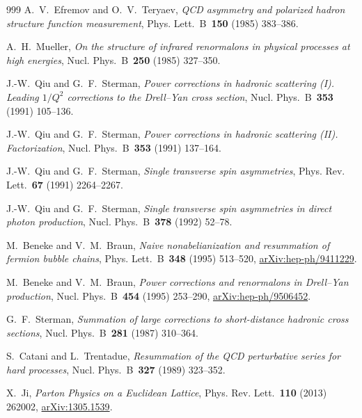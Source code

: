 \begin{thebibliography}{999}
A.~V.~Efremov and O.~V.~Teryaev, \emph{QCD asymmetry and polarized hadron structure function measurement}, Phys. Lett.~B~\textbf{150} (1985) \mbox{383--386}.

A.~H.~Mueller, \emph{On the structure of infrared renormalons in physical processes at high energies}, Nucl. Phys.~B~\textbf{250} (1985) \mbox{327--350}.

J.-W.~Qiu and G.~F.~Sterman, \emph{Power corrections in hadronic scattering (I). Leading $1/Q^2$ corrections to the Drell--Yan cross section}, Nucl. Phys.~B~\textbf{353} (1991) \mbox{105--136}.

J.-W.~Qiu and G.~F.~Sterman, \emph{Power corrections in hadronic scattering (II). Factorization}, Nucl. Phys.~B~\textbf{353} (1991) \mbox{137--164}.

J.-W.~Qiu and G.~F.~Sterman, \emph{Single transverse spin asymmetries}, Phys. Rev. Lett.~\textbf{67} (1991) \mbox{2264--2267}.

J.-W.~Qiu and G.~F.~Sterman, \emph{Single transverse spin asymmetries in direct photon production}, Nucl. Phys.~B~\textbf{378} (1992) \mbox{52--78}.

M.~Beneke and V.~M.~Braun, \emph{Naive nonabelianization and resummation of fermion bubble chains}, Phys. Lett.~B~\textbf{348} (1995) \mbox{513--520}, \href{https://arxiv.org/abs/hep-ph/9411229}{arXiv:hep-ph/9411229}.

M.~Beneke and V.~M.~Braun, \emph{Power corrections and renormalons in Drell--Yan production}, Nucl. Phys.~B~\textbf{454} (1995) \mbox{253--290}, \href{https://arxiv.org/abs/hep-ph/9506452}{arXiv:hep-ph/9506452}.

G.~F.~Sterman, \emph{Summation of large corrections to short-distance hadronic cross sections}, Nucl. Phys.~B~\textbf{281} (1987) \mbox{310--364}.

S.~Catani and L.~Trentadue, \emph{Resummation of the QCD perturbative series for hard processes}, Nucl. Phys.~B~\textbf{327} (1989) \mbox{323--352}.

X.~Ji, \emph{Parton Physics on a Euclidean Lattice}, Phys. Rev. Lett.~\textbf{110} (2013) \mbox{262002}, \href{https://arxiv.org/abs/1305.1539}{arXiv:1305.1539}.


\end{thebibliography}
